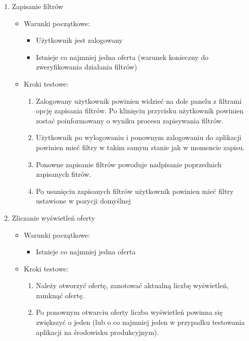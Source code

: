 \begin{enumerate}
 \item Zapisanie filtrów
  \begin{itemize}
   \item Warunki początkowe:
    \begin{itemize}
     \item Użytkownik jest zalogowany
     \item Istnieje co najmniej jedna oferta (warunek konieczny do zweryfikowania działania filtrów)
    \end{itemize}
   \item Kroki testowe:
    \begin{enumerate}
     \item Zalogowany użytkownik powinien widzieć na dole panelu z filtrami opcję zapisania filtrów. Po klinięciu przycisku użytkownik powinien zostać poinformowany o wyniku procesu zapisywania filtrów.
     \item Użytkownik po wylogowaniu i ponownym zalogowaniu do aplikacji powinien mieć filtry w takim samym stanie jak w momencie zapisu.
     \item Ponowne zapisanie filtrów powoduje nadpisanie poprzednich zapisanych fitrów.
     \item Po usunięciu zapisanych filtrów użytkownik powinien mieć filtry ustawione w pozycji domyślnej 
    \end{enumerate}
  \end{itemize}

 \item Zliczanie wyświetleń oferty
  \begin{itemize}
   \item Warunki początkowe:
    \begin{itemize}
     \item Istnieje co najmniej jedna oferta
    \end{itemize}
   \item Kroki testowe:
    \begin{enumerate}
     \item Należy otworzyć ofertę, zanotować aktualną liczbę wyświetleń, zamknąć ofertę.
     \item Po ponownym otwarciu oferty liczba wyświetleń powinna się zwiększyć o jeden (lub o co najmniej jeden w przypadku testowania aplikacji na środowisku produkcyjnym).
    \end{enumerate}
  \end{itemize}
\end{enumerate}

